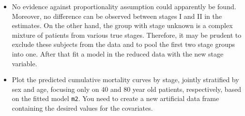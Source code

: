 \documentclass[
]{book}
\newenvironment{Shaded}{\begin{snugshade}}{\end{snugshade}}
\newcommand{\AttributeTok}[1]{\textcolor[rgb]{0.13,0.29,0.53}{#1}}
\newcommand{\DecValTok}[1]{\textcolor[rgb]{0.00,0.00,0.81}{#1}}
\newcommand{\FunctionTok}[1]{\textcolor[rgb]{0.13,0.29,0.53}{\textbf{#1}}}
\newcommand{\NormalTok}[1]{#1}
\newcommand{\OtherTok}[1]{\textcolor[rgb]{0.56,0.35,0.01}{#1}}
\newcommand{\SpecialCharTok}[1]{\textcolor[rgb]{0.81,0.36,0.00}{\textbf{#1}}}
\newcommand{\StringTok}[1]{\textcolor[rgb]{0.31,0.60,0.02}{#1}}
\providecommand{\tightlist}{%
  \setlength{\itemsep}{0pt}\setlength{\parskip}{0pt}}
\begin{document}
\begin{itemize}
\tightlist
\item
  No evidence against proportionality assumption could apparently be found.
  Moreover, no difference can be observed between stages I and II in the estimates.
  On the other hand, the
  group with stage unknown is a complex mixture of patients from various
  true stages. Therefore, it may be prudent to exclude these subjects from the data
  and to pool the first two stage groups into one. After that fit a model in
  the reduced data with the new stage variable.
\end{itemize}

\begin{Shaded}
\end{Shaded}

\begin{itemize}
\tightlist
\item
  Plot the predicted cumulative mortality curves by stage,
  jointly stratified by sex and age, focusing
  only on 40 and 80 year old patients, respectively,
  based on the fitted model \texttt{m2}.
  You need to create a new artificial data frame
  containing the desired values for the covariates.
\end{itemize}
\end{document}
